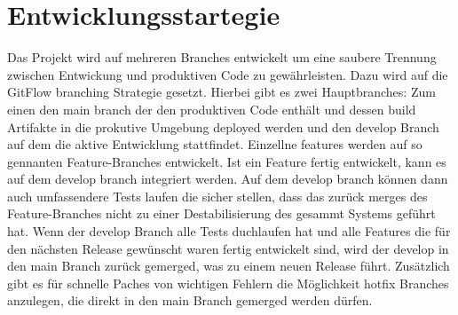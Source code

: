 \chapter{Entwicklungsstartegie}

Das Projekt wird auf mehreren Branches entwickelt um eine saubere Trennung zwischen Entwickung und produktiven Code zu gewährleisten. Dazu wird auf die GitFlow branching Strategie gesetzt. Hierbei gibt es zwei Hauptbranches: Zum einen den main branch der den produktiven Code enthält und dessen build Artifakte in die prokutive Umgebung deployed werden und den develop Branch auf dem die aktive Entwicklung stattfindet. Einzellne features werden auf so gennanten Feature-Branches entwickelt. Ist ein Feature fertig entwickelt, kann es auf dem develop branch integriert werden. Auf dem develop branch können dann auch umfassendere Tests laufen die sicher stellen, dass das zurück merges des Feature-Branches nicht zu einer Destabilisierung des gesammt Systems geführt hat. Wenn der develop Branch alle Tests duchlaufen hat und alle Features die für den nächsten Release gewünscht waren fertig entwickelt sind, wird der develop in den main Branch zurück gemerged, was zu einem neuen Release führt.
Zusätzlich gibt es für schnelle Paches von wichtigen Fehlern die Möglichkeit hotfix Branches anzulegen, die direkt in den main Branch gemerged werden dürfen.
